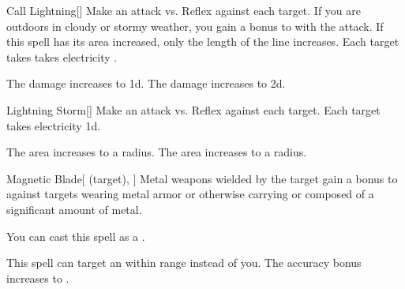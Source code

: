 \lowercase{\hypertarget{spell:Call Lightning}{}}\label{spell:Call Lightning}
\begin{freeability}[Rank 3]{\hypertarget{spell:Call Lightning}{Call Lightning}}[]
Make an attack vs. Reflex against each target.
If you are outdoors in cloudy or stormy weather, you gain a  bonus to  with the attack.
If this spell has its area increased, only the length of the line increases.
\hit Each target takes takes electricity .


\rankline
{} The damage increases to  \plus1d.
 The damage increases to  \plus2d.

\end{freeability}
\vspace{0.25em}



\lowercase{\hypertarget{spell:Lightning Storm}{}}\label{spell:Lightning Storm}
\begin{freeability}[Rank 3]{\hypertarget{spell:Lightning Storm}{Lightning Storm}}[]
Make an attack vs. Reflex against each target.
\hit Each target takes electricity  \minus1d.

\rankline
{} The area increases to a \arealarge radius.
 The area increases to a \areahuge radius.

\end{freeability}
\vspace{0.25em}



\lowercase{\hypertarget{spell:Magnetic Blade}{}}\label{spell:Magnetic Blade}
\begin{attuneability}[Rank 3]{\hypertarget{spell:Magnetic Blade}{Magnetic Blade}}[ (target), ]
Metal weapons wielded by the target gain a  bonus to  against targets wearing metal armor or otherwise carrying or composed of a significant amount of metal.

You can cast this spell as a .

\rankline
{} This spell can target an  within \rngmed range instead of you.
 The accuracy bonus increases to .

\end{attuneability}
\vspace{0.25em}



